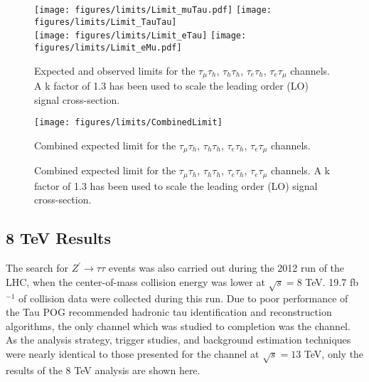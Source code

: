 
\begin{figure}[tbh!]
  \centering
  \texttt{[image: figures/limits/Limit\_muTau.pdf]}
  \texttt{[image: figures/limits/Limit\_TauTau]}\\
  \texttt{[image: figures/limits/Limit\_eTau]}
  \texttt{[image: figures/limits/Limit\_eMu.pdf]}
  \caption{Expected and observed limits for the $\tau_{\mu}\tau_{h}$, $\tau_{h}\tau_{h}$, $\tau_{e}\tau_{h}$, $\tau_{e}\tau_{\mu}$ channels. A k factor of 1.3 has been used to scale the leading order (LO) signal cross-section.} 
    \label{fig:Limits}
\end{figure}

\begin{figure}[tbh!]
  \centering
  \texttt{[image: figures/limits/CombinedLimit]}  \caption{Combined expected limit for the $\tau_{\mu}\tau_{h}$, $\tau_{h}\tau_{h}$, $\tau_{e}\tau_{h}$, $\tau_{e}\tau_{\mu}$ channels.}
  \caption{Combined expected limit for the $\tau_{\mu}\tau_{h}$, $\tau_{h}\tau_{h}$, $\tau_{e}\tau_{h}$, $\tau_{e}\tau_{\mu}$ channels. A k factor of 1.3 has been used to scale the leading order (LO) signal cross-section.}
  \label{fig:CombinedLimits}
\end{figure}



\subsection{8 TeV Results}

The search for $Z^{\prime}\to\tau\tau$ events was also carried out during the 2012 run of the LHC, when the center-of-mass collision energy was lower at $\sqrt{s} = 8$ TeV. 19.7 fb$^{-1}$ of collision data were collected during this run. Due to poor performance of the Tau POG recommended hadronic tau identification and reconstruction algorithms, the only channel which was studied to completion was the \emu channel. As the analysis strategy, trigger studies, and background estimation techniques were nearly identical to those presented for the \emu channel at $\sqrt{s} = 13$ TeV, only the results of the 8 TeV \emu analysis are shown here.

